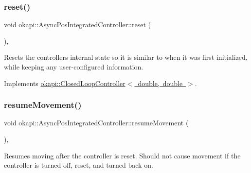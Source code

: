 \mbox{\label{classokapi_1_1AsyncPosIntegratedController_a5858445747fe5a03f17f6fd83ee9aaaa}} 
\subsubsection{\texorpdfstring{reset()}{reset()}}
{\footnotesize\ttfamily void okapi\+::\+Async\+Pos\+Integrated\+Controller\+::reset (\begin{DoxyParamCaption}{ }\end{DoxyParamCaption})\hspace{0.3cm}{\ttfamily [override]}, {\ttfamily [virtual]}}

Resets the controller\textquotesingle{}s internal state so it is similar to when it was first initialized, while keeping any user-\/configured information. 

Implements \mbox{\hyperlink{classokapi_1_1ClosedLoopController_a7dd6ce28b3e38bdf987514a1b6c83c8c}{okapi\+::\+Closed\+Loop\+Controller$<$ double, double $>$}}.

\mbox{\label{classokapi_1_1AsyncPosIntegratedController_aacdf10d9717b1e02c3df095c8bb95fb0}} 
\subsubsection{\texorpdfstring{resumeMovement()}{resumeMovement()}}
{\footnotesize\ttfamily void okapi\+::\+Async\+Pos\+Integrated\+Controller\+::resume\+Movement (\begin{DoxyParamCaption}{ }\end{DoxyParamCaption})\hspace{0.3cm}{\ttfamily [protected]}, {\ttfamily [virtual]}}

Resumes moving after the controller is reset. Should not cause movement if the controller is turned off, reset, and turned back on. \mbox{\label{classokapi_1_1AsyncPosIntegratedController_a4e92e8c03b5e24cb60575fa508eb6c31}} 

